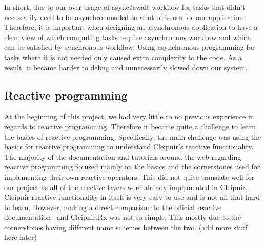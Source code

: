 In short, due to our over usage of async/await workflow for tasks that didn’t necessarily need to be asynchronous led to a lot of issues for our application. Therefore, it is important when designing an asynchronous application to have a clear view of which computing tasks require asynchronous workflow and which can be satisfied by synchronous workflow. Using asynchronous programming for tasks where it is not needed only caused extra complexity to the code. As a result, it became harder to debug and unnecessarily slowed down our system.

\subsection{Reactive programming}
At the beginning of this project, we had very little to no previous experience in regards to reactive programming. Therefore it became quite a challenge to learn the basics of reactive programming. Specifically, the main challenge was using the basics for reactive programming to understand Cleipnir’s reactive functionality. The majority of the documentation and tutorials around the web regarding reactive programming focused mainly on the basics and the cornerstones used for implementing their own reactive operators. This did not quite translate well for our project as all of the reactive layers were already implemented in Cleipnir. Cleipnir reactive functionality in itself is very easy to use and is not all that hard to learn. However, making a direct comparison to the official reactive documentation~\cite{WEB:ReactiveXMainPage} and Cleipnir.Rx was not so simple. This mostly due to the cornerstones having different name schemes between the two.  (add more stuff here later)


